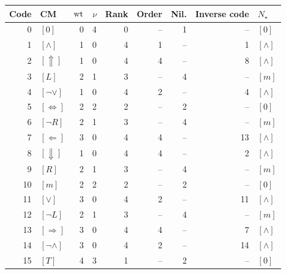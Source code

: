 \begin{center}\small
\begin{tabular}{@{}rlrrrrrrl@{}}
\toprule
Code & CM & $\operatorname{wt}$ & $\nu$ & Rank & Order & Nil. & Inverse code & $N_\star$\\\midrule
0 & $[0]$ & 0 & 4 & 0 & -- & 1 & -- & $[0]$\\
1 & $[\wedge]$ & 1 & 0 & 4 & 1 & -- & 1 & $[\wedge]$\\
2 & $[\Uparrow]$ & 1 & 0 & 4 & 4 & -- & 8 & $[\wedge]$\\
3 & $[L]$ & 2 & 1 & 3 & -- & 4 & -- & $[m]$\\
4 & $[\neg\vee]$ & 1 & 0 & 4 & 2 & -- & 4 & $[\wedge]$\\
5 & $[\Leftrightarrow]$ & 2 & 2 & 2 & -- & 2 & -- & $[0]$\\
6 & $[\neg R]$ & 2 & 1 & 3 & -- & 4 & -- & $[m]$\\
7 & $[\Leftarrow]$ & 3 & 0 & 4 & 4 & -- & 13 & $[\wedge]$\\
8 & $[\Downarrow]$ & 1 & 0 & 4 & 4 & -- & 2 & $[\wedge]$\\
9 & $[R]$ & 2 & 1 & 3 & -- & 4 & -- & $[m]$\\
10 & $[m]$ & 2 & 2 & 2 & -- & 2 & -- & $[0]$\\
11 & $[\vee]$ & 3 & 0 & 4 & 2 & -- & 11 & $[\wedge]$\\
12 & $[\neg L]$ & 2 & 1 & 3 & -- & 4 & -- & $[m]$\\
13 & $[\Rightarrow]$ & 3 & 0 & 4 & 4 & -- & 7 & $[\wedge]$\\
14 & $[\neg\wedge]$ & 3 & 0 & 4 & 2 & -- & 14 & $[\wedge]$\\
15 & $[T]$ & 4 & 3 & 1 & -- & 2 & -- & $[0]$\\
\bottomrule\end{tabular}
\end{center}
